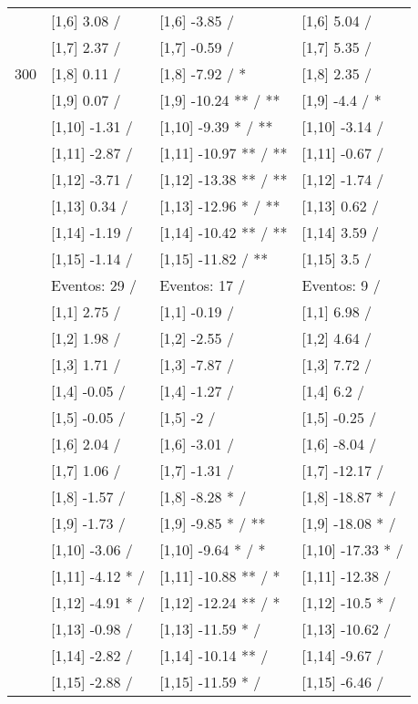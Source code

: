\begin{table}
\begin{tabular}[t]{llll}
 & {}[1,6] 3.08  / & {}[1,6] -3.85  / & {}[1,6] 5.04  /\\
 & {}[1,7] 2.37  / & {}[1,7] -0.59  / & {}[1,7] 5.35  /\\
300 & {}[1,8] 0.11  / & {}[1,8] -7.92  / * & {}[1,8] 2.35  /\\
\addlinespace
 & {}[1,9] 0.07  / & {}[1,9] -10.24 ** / ** & {}[1,9] -4.4  / *\\
 & {}[1,10] -1.31  / & {}[1,10] -9.39 * / ** & {}[1,10] -3.14  /\\
 & {}[1,11] -2.87  / & {}[1,11] -10.97 ** / ** & {}[1,11] -0.67  /\\
 & {}[1,12] -3.71  / & {}[1,12] -13.38 ** / ** & {}[1,12] -1.74  /\\
 & {}[1,13] 0.34  / & {}[1,13] -12.96 * / ** & {}[1,13] 0.62  /\\
\addlinespace
 & {}[1,14] -1.19  / & {}[1,14] -10.42 ** / ** & {}[1,14] 3.59  /\\
 & {}[1,15] -1.14  / & {}[1,15] -11.82  / ** & {}[1,15] 3.5  /\\
 & Eventos:  29 / & Eventos:  17 / & Eventos:  9 /\\
 & {}[1,1] 2.75  / & {}[1,1] -0.19  / & {}[1,1] 6.98  /\\
 & {}[1,2] 1.98  / & {}[1,2] -2.55  / & {}[1,2] 4.64  /\\
\addlinespace
 & {}[1,3] 1.71  / & {}[1,3] -7.87  / & {}[1,3] 7.72  /\\
 & {}[1,4] -0.05  / & {}[1,4] -1.27  / & {}[1,4] 6.2  /\\
 & {}[1,5] -0.05  / & {}[1,5] -2  / & {}[1,5] -0.25  /\\
 & {}[1,6] 2.04  / & {}[1,6] -3.01  / & {}[1,6] -8.04  /\\
 & {}[1,7] 1.06  / & {}[1,7] -1.31  / & {}[1,7] -12.17  /\\
\addlinespace
500 & {}[1,8] -1.57  / & {}[1,8] -8.28 * / & {}[1,8] -18.87 * /\\
 & {}[1,9] -1.73  / & {}[1,9] -9.85 * / ** & {}[1,9] -18.08 * /\\
 & {}[1,10] -3.06  / & {}[1,10] -9.64 * / * & {}[1,10] -17.33 * /\\
 & {}[1,11] -4.12 * / & {}[1,11] -10.88 ** / * & {}[1,11] -12.38  /\\
 & {}[1,12] -4.91 * / & {}[1,12] -12.24 ** / * & {}[1,12] -10.5 * /\\
\addlinespace
 & {}[1,13] -0.98  / & {}[1,13] -11.59 * / & {}[1,13] -10.62  /\\
 & {}[1,14] -2.82  / & {}[1,14] -10.14 ** / & {}[1,14] -9.67  /\\
 & {}[1,15] -2.88  / & {}[1,15] -11.59 * / & {}[1,15] -6.46  /\\
\bottomrule
\end{tabular}
\end{table}
